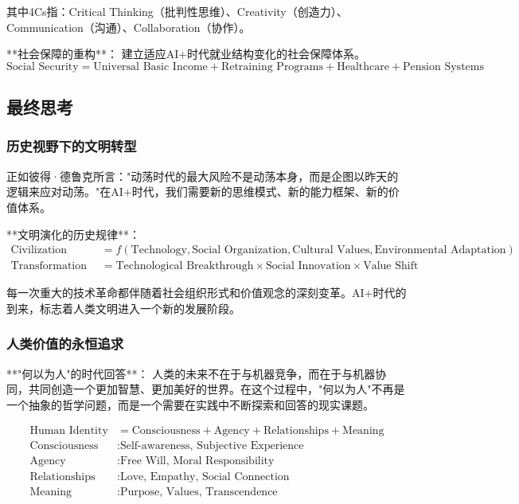 其中4Cs指：Critical Thinking（批判性思维）、Creativity（创造力）、Communication（沟通）、Collaboration（协作）。

**社会保障的重构**：
建立适应AI+时代就业结构变化的社会保障体系。
\begin{equation}
\text{Social Security} = \text{Universal Basic Income} + \text{Retraining Programs} + \text{Healthcare} + \text{Pension Systems}
\end{equation}

\subsection{最终思考} %

\subsubsection{历史视野下的文明转型} %

正如彼得·德鲁克所言："动荡时代的最大风险不是动荡本身，而是企图以昨天的逻辑来应对动荡。"在AI+时代，我们需要新的思维模式、新的能力框架、新的价值体系。

**文明演化的历史规律**：
\begin{align}
\text{Civilization Evolution} &= f(\text{Technology}, \text{Social Organization}, \text{Cultural Values}, \text{Environmental Adaptation}) \\
\text{Transformation Catalyst} &= \text{Technological Breakthrough} \times \text{Social Innovation} \times \text{Value Shift}
\end{align}

每一次重大的技术革命都伴随着社会组织形式和价值观念的深刻变革。AI+时代的到来，标志着人类文明进入一个新的发展阶段。

\subsubsection{人类价值的永恒追求} %

**"何以为人"的时代回答**：
人类的未来不在于与机器竞争，而在于与机器协同，共同创造一个更加智慧、更加美好的世界。在这个过程中，"何以为人"不再是一个抽象的哲学问题，而是一个需要在实践中不断探索和回答的现实课题。

\begin{align}
\text{Human Identity} &= \text{Consciousness} + \text{Agency} + \text{Relationships} + \text{Meaning} \\
\text{Consciousness} &: \text{Self-awareness, Subjective Experience} \\
\text{Agency} &: \text{Free Will, Moral Responsibility} \\
\text{Relationships} &: \text{Love, Empathy, Social Connection} \\
\text{Meaning} &: \text{Purpose, Values, Transcendence}
\end{align}

